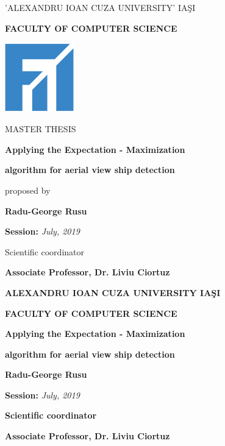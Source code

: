 \documentclass[a4paper, 12pt, oneside]{Thesis}  %
\begin{document}
\pagestyle{empty}
\centerline{\small{'ALEXANDRU IOAN CUZA UNIVERSITY' IA\c SI}}
\vspace{0.5cm}
\centerline{\textbf{\Large{\textsf{FACULTY OF COMPUTER SCIENCE}}}}
\vspace{3cm}
\begin{center}
	\includegraphics[width=3cm,height=3cm]{Pictures/fii-01.png}
\end{center}
\vspace{3cm}
\centerline{\Large{MASTER THESIS}}
\vspace{1cm}
\centerline{\textbf{\LARGE{Applying the Expectation - Maximization}}}
\vspace{0.2cm}
\centerline{\textbf{\LARGE{algorithm for aerial view ship detection}}}
\vspace{1cm}
\centerline{proposed by}
\vspace{1cm}
\centerline{\textbf{\Large{\textsf{Radu-George Rusu}}}}
\vspace{2cm}
\centerline{\textsf{\textbf{Session:} \textit{July, 2019}}}
\vspace{0.5cm}
\centerline{Scientific coordinator}
\vspace{0.5cm}
\centerline{\textsf{\textbf{\large{Associate Professor, Dr. Liviu Ciortuz}}}}

\clearpage

\pagestyle{empty}
\centerline{\textbf{\large{\textsf{ALEXANDRU IOAN CUZA UNIVERSITY IA\c SI}}}}
\vspace{0.5cm}
\centerline{\textbf{\large{\textsf{FACULTY OF COMPUTER SCIENCE}}}}
\vspace{5cm}
\centerline{\textbf{\LARGE{Applying the Expectation - Maximization}}}
\vspace{0.2cm}
\centerline{\textbf{\LARGE{algorithm for aerial view ship detection}}}
\vspace{3cm}
\centerline{\textbf{\Large{\textsf{Radu-George Rusu}}}}
\vspace{2cm}
\centerline{\Large{{\textsf{\textbf{Session:} \textit{July, 2019}}}}}
\vspace{4.5cm}
\centerline{\textbf{Scientific coordinator}}
\vspace{0.5cm}
\centerline{\textsf{\textbf{\large{Associate Professor, Dr. Liviu Ciortuz}}}}
\end{document}
